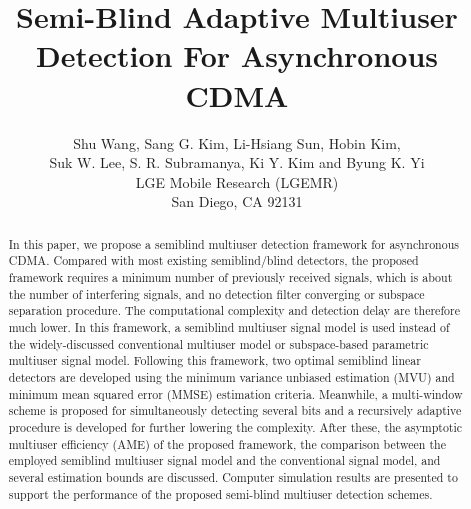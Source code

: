\documentclass[a4paper,10pt,fleqn, twocolumn]{IEEETran}
\title{ Semi-Blind Adaptive Multiuser Detection For Asynchronous CDMA }
\date{}
\author{Shu Wang, Sang G. Kim, Li-Hsiang Sun, Hobin Kim,\\Suk W. Lee, S. R. Subramanya, Ki Y. Kim and Byung K. Yi\\
LGE Mobile Research (LGEMR)\\San Diego, CA 92131}
\begin{document}
\maketitle
\begin{abstract}\small
In this paper, we propose a semiblind multiuser detection
framework for asynchronous CDMA. Compared with most existing
semiblind/blind detectors, the proposed framework requires a
minimum number of previously received signals, which is about the
number of interfering signals, and no detection filter converging
or subspace separation procedure. The computational complexity and
detection delay are therefore much lower. In this framework, a
semiblind multiuser signal model is used instead of the
widely-discussed conventional multiuser model or subspace-based
parametric multiuser signal model. Following this framework, two
optimal semiblind linear detectors are developed using the minimum
variance unbiased estimation (MVU) and minimum mean squared error
(MMSE) estimation criteria. Meanwhile, a multi-window scheme is
proposed for simultaneously detecting several bits and a
recursively adaptive procedure is developed for further lowering
the complexity. After these, the asymptotic multiuser efficiency
(AME) of the proposed framework, the comparison between the
employed semiblind multiuser signal model and the conventional
signal model, and several estimation bounds are discussed.
Computer simulation results are presented to support the
performance of the proposed semi-blind multiuser detection
schemes.
\end{abstract}
\end{document}
